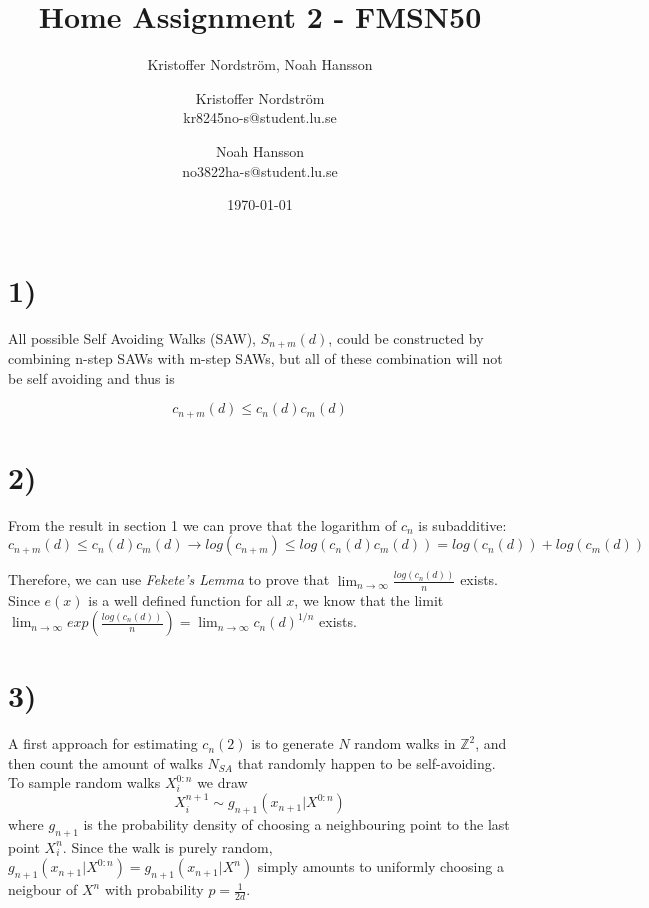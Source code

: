 \documentclass[a4paper]{article}
\title{Home Assignment 2 - FMSN50}
\author{Kristoffer Nordström, Noah Hansson}\author{Kristoffer Nordström \\ kr8245no-s@student.lu.se \and  Noah Hansson \\ no3822ha-s@student.lu.se}
\date{\today}
\begin{document}
\maketitle
\newpage

\section*{1)}

All possible Self Avoiding Walks (SAW), $S_{n+m}(d)$, could be constructed by combining n-step SAWs with m-step SAWs, but all of these combination will not be self avoiding and thus is

\begin{equation}
    \label{eq:multiplicity}
    c_{n+m}(d)\leq c_n(d)c_m(d)
\end{equation}

\section*{2)}
From the result in section 1 we can prove that the logarithm of $c_n$ is subadditive:
\begin{equation}
    c_{n+m}(d) \leq c_n(d)c_m(d) \rightarrow log(c_{n+m}) \leq log(c_n(d)c_m(d)) = log(c_n(d)) + log(c_m(d))
\end{equation}

 Therefore, we can use \textit{Fekete's Lemma} to prove that $\lim_{n\rightarrow\infty} \frac{log(c_n(d))}{n}$ exists. Since $e(x)$ is a well defined function for all $x$, we know that the limit $\lim_{n\rightarrow\infty} exp(\frac{log(c_n(d))}{n}) = \lim_{n\rightarrow\infty} c_n(d)^{1/n}$ exists. 

\section*{3)}
A first approach for estimating $c_n(2)$ is to generate $N$ random walks in $\mathbb{Z}^2$, and then count the amount of walks $N_{SA}$ that randomly happen to be self-avoiding. To sample random walks $X_i^{0:n}$ we draw 
\begin{equation}
    X_i^{n+1} \sim g_{n+1}(x_{n+1}|X^{0:n})
\end{equation}
where $g_{n+1}$ is the probability density of choosing a neighbouring point to the last point $X_i^n$. Since the walk is purely random, $g_{n+1}(x_{n+1}|X^{0:n}) = g_{n+1}(x_{n+1}|X^n)$ simply amounts to uniformly choosing a neigbour of $X^n$ with probability $p = \frac{1}{2d}$.
\end{document}
